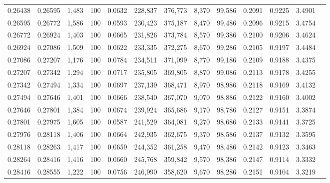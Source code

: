 \begin{tabular}{rrrrrrrrrrrrr}
0.26438 & 0.26595 & 1,483 & 100 &                                     0.0632 & 228,837 & 376,773 &   8,370 &  99,586 & 0.2091 & 0.9225 & 3.4901 \\
0.26595 & 0.26772 & 1,586 & 100 &                                     0.0593 & 230,423 & 375,187 &   8,470 &  99,486 & 0.2096 & 0.9215 & 3.4754 \\
0.26772 & 0.26924 & 1,403 & 100 &                                     0.0665 & 231,826 & 373,784 &   8,570 &  99,386 & 0.2100 & 0.9206 & 3.4624 \\
0.26924 & 0.27086 & 1,509 & 100 &                                     0.0622 & 233,335 & 372,275 &   8,670 &  99,286 & 0.2105 & 0.9197 & 3.4484 \\
0.27086 & 0.27207 & 1,176 & 100 &                                     0.0784 & 234,511 & 371,099 &   8,770 &  99,186 & 0.2109 & 0.9188 & 3.4375 \\
0.27207 & 0.27342 & 1,294 & 100 &                                     0.0717 & 235,805 & 369,805 &   8,870 &  99,086 & 0.2113 & 0.9178 & 3.4255 \\
0.27342 & 0.27494 & 1,334 & 100 &                                     0.0697 & 237,139 & 368,471 &   8,970 &  98,986 & 0.2118 & 0.9169 & 3.4132 \\
0.27494 & 0.27646 & 1,401 & 100 &                                     0.0666 & 238,540 & 367,070 &   9,070 &  98,886 & 0.2122 & 0.9160 & 3.4002 \\
0.27646 & 0.27801 & 1,384 & 100 &                                     0.0674 & 239,924 & 365,686 &   9,170 &  98,786 & 0.2127 & 0.9151 & 3.3874 \\
0.27801 & 0.27975 & 1,605 & 100 &                                     0.0587 & 241,529 & 364,081 &   9,270 &  98,686 & 0.2133 & 0.9141 & 3.3725 \\
0.27976 & 0.28118 & 1,406 & 100 &                                     0.0664 & 242,935 & 362,675 &   9,370 &  98,586 & 0.2137 & 0.9132 & 3.3595 \\
0.28118 & 0.28263 & 1,417 & 100 &                                     0.0659 & 244,352 & 361,258 &   9,470 &  98,486 & 0.2142 & 0.9123 & 3.3463 \\
0.28264 & 0.28416 & 1,416 & 100 &                                     0.0660 & 245,768 & 359,842 &   9,570 &  98,386 & 0.2147 & 0.9114 & 3.3332 \\
0.28416 & 0.28555 & 1,222 & 100 &                                     0.0756 & 246,990 & 358,620 &   9,670 &  98,286 & 0.2151 & 0.9104 & 3.3219 \\

\end{tabular}
